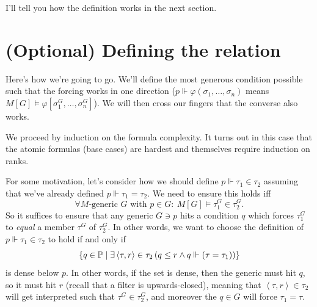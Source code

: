 I'll tell you how the definition works in the next section.

\section{(Optional) Defining the relation}
Here's how we're going to go.
We'll define the most generous condition possible such that
the forcing works in one direction ($p \Vdash \varphi(\sigma_1, \dots, \sigma_n)$ means
$M[G] \vDash \varphi[\sigma_1^G, \dots, \sigma_n^G]$).
We will then cross our fingers that the converse also works.

We proceed by induction on the formula complexity.
It turns out in this case that the atomic formulas (base cases)
are hardest and themselves require induction on ranks.

For some motivation, let's consider how we should define
$p \Vdash \tau_1 \in \tau_2$ assuming that we've
already defined $p \Vdash \tau_1 = \tau_2$.
We need to ensure this holds iff
\[ \forall \text{$M$-generic $G$ with $p \in G$}:
	\ M[G] \vDash \tau_1^G \in \tau_2^G. \]
So it suffices to ensure that any generic $G \ni p$ hits a condition $q$ which forces $\tau_1^G$ to \emph{equal} a member $\tau^G$ of $\tau_2^G$.
In other words, we want to choose the definition of $p \Vdash \tau_1 \in \tau_2$ to hold if and only if
\[
	\left\{ q \in \mathbb P
		\mid \exists \left<\tau, r\right> \in \tau_2
		\left( q \le r \land q \Vdash(\tau=\tau_1) \right) \right\}
\]
is dense below $p$.
In other words, if the set is dense, then the generic must hit $q$, so it must hit $r$
(recall that a filter is upwards-closed),
meaning that $\left<\tau, r\right> \in \tau_2$ will get interpreted such that $\tau^G \in \tau_2^G$, and moreover the $q \in G$ will force $\tau_1 = \tau$.

